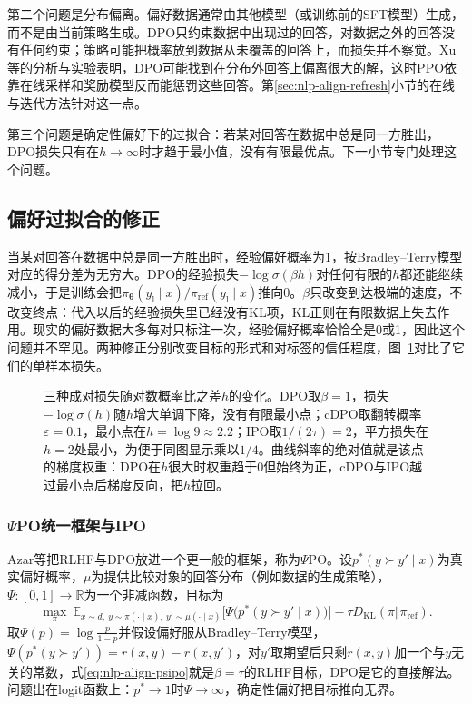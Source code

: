 第二个问题是分布偏离。偏好数据通常由其他模型（或训练前的SFT模型）生成，而不是由当前策略生成。DPO只约束数据中出现过的回答，对数据之外的回答没有任何约束；策略可能把概率放到数据从未覆盖的回答上，而损失并不察觉。Xu等的分析与实验表明，DPO可能找到在分布外回答上偏离很大的解，这时PPO依靠在线采样和奖励模型反而能惩罚这些回答。第\ref{sec:nlp-align-refresh}小节的在线与迭代方法针对这一点。

第三个问题是确定性偏好下的过拟合：若某对回答在数据中总是同一方胜出，DPO损失只有在$h\to\infty$时才趋于最小值，没有有限最优点。下一小节专门处理这个问题。

\subsection{偏好过拟合的修正}
\label{sec:nlp-align-overfitting}

当某对回答在数据中总是同一方胜出时，经验偏好概率为1，按Bradley--Terry模型对应的得分差为无穷大。DPO的经验损失$-\log\sigma(\beta h)$对任何有限的$h$都还能继续减小，于是训练会把$\pi_{\bm\theta}(y_{\mathrm l}\mid x)/\pi_{\mathrm{ref}}(y_{\mathrm l}\mid x)$推向0。$\beta$只改变到达极端的速度，不改变终点：代入以后的经验损失里已经没有KL项，KL正则在有限数据上失去作用。现实的偏好数据大多每对只标注一次，经验偏好概率恰恰全是0或1，因此这个问题并不罕见。两种修正分别改变目标的形式和对标签的信任程度，图~\ref{fig:nlp-align-pairwise-losses}对比了它们的单样本损失。

\begin{figure}[htbp]
  \centering
  
  \caption{三种成对损失随对数概率比之差$h$的变化。DPO取$\beta=1$，损失$-\log\sigma(h)$随$h$增大单调下降，没有有限最小点；cDPO取翻转概率$\varepsilon=0.1$，最小点在$h=\log 9\approx2.2$；IPO取$1/(2\tau)=2$，平方损失在$h=2$处最小，为便于同图显示乘以$1/4$。曲线斜率的绝对值就是该点的梯度权重：DPO在$h$很大时权重趋于0但始终为正，cDPO与IPO越过最小点后梯度反向，把$h$拉回。}
  \label{fig:nlp-align-pairwise-losses}
\end{figure}

\subsubsection{\texorpdfstring{$\Psi$PO统一框架与IPO}{ΨPO统一框架与IPO}}
\label{sec:nlp-align-ipo}

Azar等把RLHF与DPO放进一个更一般的框架，称为$\Psi$PO。设$p^*(y\succ y'\mid x)$为真实偏好概率，$\mu$为提供比较对象的回答分布（例如数据的生成策略），$\Psi:[0,1]\to\mathbb R$为一个非减函数，目标为
\begin{equation}
\label{eq:nlp-align-psipo}
 \max_{\pi}\ \mathbb E_{x\sim d,\ y\sim\pi(\cdot\mid x),\ y'\sim\mu(\cdot\mid x)}
 \bigl[\Psi\bigl(p^*(y\succ y'\mid x)\bigr)\bigr]
 -\tau D_{\mathrm{KL}}(\pi\Vert\pi_{\mathrm{ref}}).
\end{equation}
取$\Psi(p)=\log\frac{p}{1-p}$并假设偏好服从Bradley--Terry模型，$\Psi(p^*(y\succ y'))=r(x,y)-r(x,y')$，对$y'$取期望后只剩$r(x,y)$加一个与$y$无关的常数，式\eqref{eq:nlp-align-psipo}就是$\beta=\tau$的RLHF目标，DPO是它的直接解法。问题出在logit函数上：$p^*\to1$时$\Psi\to\infty$，确定性偏好把目标推向无界。

